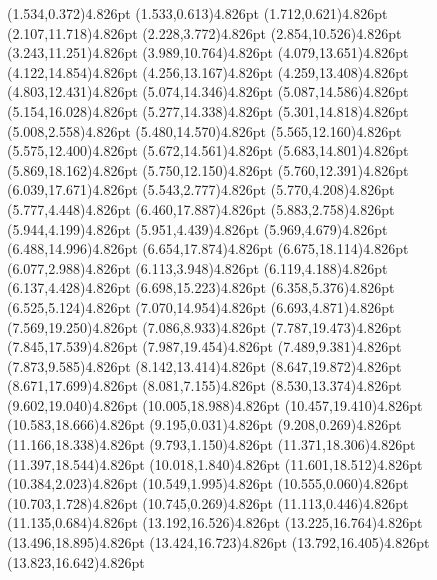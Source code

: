\documentclass[10pt]{article}
\begin{document}
{{\qdisk(1.534,0.372){4.826pt}%
\qdisk(1.533,0.613){4.826pt}%
\qdisk(1.712,0.621){4.826pt}%
\qdisk(2.107,11.718){4.826pt}%
\qdisk(2.228,3.772){4.826pt}%
\qdisk(2.854,10.526){4.826pt}%
\qdisk(3.243,11.251){4.826pt}%
\qdisk(3.989,10.764){4.826pt}%
\qdisk(4.079,13.651){4.826pt}%
\qdisk(4.122,14.854){4.826pt}%
\qdisk(4.256,13.167){4.826pt}%
\qdisk(4.259,13.408){4.826pt}%
\qdisk(4.803,12.431){4.826pt}%
\qdisk(5.074,14.346){4.826pt}%
\qdisk(5.087,14.586){4.826pt}%
\qdisk(5.154,16.028){4.826pt}%
\qdisk(5.277,14.338){4.826pt}%
\qdisk(5.301,14.818){4.826pt}%
\qdisk(5.008,2.558){4.826pt}%
\qdisk(5.480,14.570){4.826pt}%
\qdisk(5.565,12.160){4.826pt}%
\qdisk(5.575,12.400){4.826pt}%
\qdisk(5.672,14.561){4.826pt}%
\qdisk(5.683,14.801){4.826pt}%
\qdisk(5.869,18.162){4.826pt}%
\qdisk(5.750,12.150){4.826pt}%
\qdisk(5.760,12.391){4.826pt}%
\qdisk(6.039,17.671){4.826pt}%
\qdisk(5.543,2.777){4.826pt}%
\qdisk(5.770,4.208){4.826pt}%
\qdisk(5.777,4.448){4.826pt}%
\qdisk(6.460,17.887){4.826pt}%
\qdisk(5.883,2.758){4.826pt}%
\qdisk(5.944,4.199){4.826pt}%
\qdisk(5.951,4.439){4.826pt}%
\qdisk(5.969,4.679){4.826pt}%
\qdisk(6.488,14.996){4.826pt}%
\qdisk(6.654,17.874){4.826pt}%
\qdisk(6.675,18.114){4.826pt}%
\qdisk(6.077,2.988){4.826pt}%
\qdisk(6.113,3.948){4.826pt}%
\qdisk(6.119,4.188){4.826pt}%
\qdisk(6.137,4.428){4.826pt}%
\qdisk(6.698,15.223){4.826pt}%
\qdisk(6.358,5.376){4.826pt}%
\qdisk(6.525,5.124){4.826pt}%
\qdisk(7.070,14.954){4.826pt}%
\qdisk(6.693,4.871){4.826pt}%
\qdisk(7.569,19.250){4.826pt}%
\qdisk(7.086,8.933){4.826pt}%
\qdisk(7.787,19.473){4.826pt}%
\qdisk(7.845,17.539){4.826pt}%
\qdisk(7.987,19.454){4.826pt}%
\qdisk(7.489,9.381){4.826pt}%
\qdisk(7.873,9.585){4.826pt}%
\qdisk(8.142,13.414){4.826pt}%
\qdisk(8.647,19.872){4.826pt}%
\qdisk(8.671,17.699){4.826pt}%
\qdisk(8.081,7.155){4.826pt}%
\qdisk(8.530,13.374){4.826pt}%
\qdisk(9.602,19.040){4.826pt}%
\qdisk(10.005,18.988){4.826pt}%
\qdisk(10.457,19.410){4.826pt}%
\qdisk(10.583,18.666){4.826pt}%
\qdisk(9.195,0.031){4.826pt}%
\qdisk(9.208,0.269){4.826pt}%
\qdisk(11.166,18.338){4.826pt}%
\qdisk(9.793,1.150){4.826pt}%
\qdisk(11.371,18.306){4.826pt}%
\qdisk(11.397,18.544){4.826pt}%
\qdisk(10.018,1.840){4.826pt}%
\qdisk(11.601,18.512){4.826pt}%
\qdisk(10.384,2.023){4.826pt}%
\qdisk(10.549,1.995){4.826pt}%
\qdisk(10.555,0.060){4.826pt}%
\qdisk(10.703,1.728){4.826pt}%
\qdisk(10.745,0.269){4.826pt}%
\qdisk(11.113,0.446){4.826pt}%
\qdisk(11.135,0.684){4.826pt}%
\qdisk(13.192,16.526){4.826pt}%
\qdisk(13.225,16.764){4.826pt}%
\qdisk(13.496,18.895){4.826pt}%
\qdisk(13.424,16.723){4.826pt}%
\qdisk(13.792,16.405){4.826pt}%
\qdisk(13.823,16.642){4.826pt}%
}}
\end{document}
